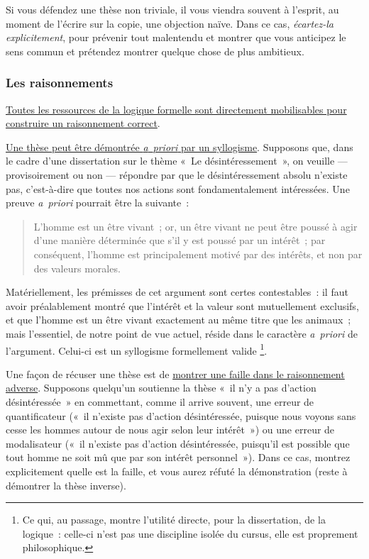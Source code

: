 \documentclass[a4paper,12pt]{article}
\begin{document}
Si vous défendez une thèse non triviale, il vous viendra souvent à
l'esprit, au moment de l'écrire sur la copie, une objection naïve. Dans
ce cas, \emph{écartez-la explicitement}, pour prévenir tout malentendu et
montrer que vous anticipez le sens commun et prétendez montrer quelque
chose de plus ambitieux.


\subsubsection{Les raisonnements}
\label{sec:orga5ba70c}

\uline{Toutes les ressources de la logique formelle sont directement
mobilisables pour construire un raisonnement correct}.

\uline{Une thèse peut être démontrée \emph{a} \emph{priori} par un syllogisme}.
Supposons que, dans le cadre d'une dissertation sur le thème « Le
désintéressement », on veuille --- provisoirement ou non --- répondre
par que le désintéressement absolu n'existe pas, c'est-à-dire que toutes
nos actions sont fondamentalement intéressées. Une preuve \emph{a priori}
pourrait être la suivante :
\begin{quote}
L'homme est un être vivant ; or, un être vivant ne peut être poussé à
agir d'une manière déterminée que s'il y est poussé par un intérêt ;
par conséquent, l'homme est principalement motivé par des intérêts, et
non par des valeurs morales.
\end{quote}
Matériellement, les prémisses de cet argument sont certes contestables :
il faut avoir préalablement montré que l'intérêt et la valeur sont
mutuellement exclusifs, et que l'homme est un être vivant exactement au
même titre que les animaux ; mais l'essentiel, de notre point de vue
actuel, réside dans le caractère \emph{a priori} de l'argument. Celui-ci est
un syllogisme formellement valide \footnote{Ce qui, au passage, montre l'utilité directe, pour la dissertation,
de la logique : celle-ci n'est pas une discipline isolée du cursus,
elle est proprement philosophique.}.

Une façon de récuser une thèse est de \uline{montrer une faille dans le
raisonnement adverse}. Supposons quelqu'un soutienne la thèse « il n'y a
pas d'action désintéressée » en commettant, comme il arrive souvent, une
erreur de quantificateur (« il n'existe pas d'action désintéressée,
puisque nous voyons sans cesse les hommes autour de nous agir selon leur
intérêt ») ou une erreur de modalisateur (« il n'existe pas d'action
désintéressée, puisqu'il est possible que tout homme ne soit mû que par
son intérêt personnel »). Dans ce cas, montrez explicitement quelle est
la faille, et vous aurez réfuté la démonstration (reste à démontrer la
thèse inverse).
\end{document}
